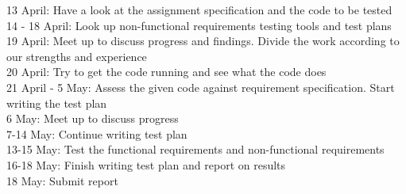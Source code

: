 13 April: Have a look at the assignment specification and the code to be tested \\
14 - 18 April: Look up non-functional requirements testing tools and test plans \\
19 April: Meet up to discuss progress and findings. Divide the work according to our strengths and experience \\
20 April: Try to get the code running and see what the code does \\
21 April - 5 May: Assess the given code against requirement specification. Start writing the test plan \\
6 May: Meet up to discuss progress \\
7-14 May: Continue writing test plan \\
13-15 May: Test the functional requirements and non-functional requirements \\
16-18 May: Finish writing test plan and report on results \\
18 May: Submit report 
